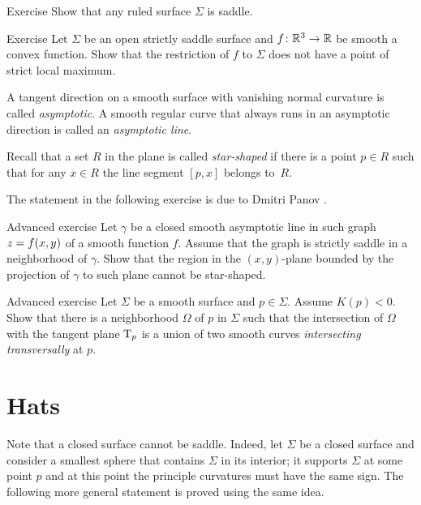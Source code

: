 \begin{thm}{Exercise}\label{ex:ruled=>saddle}
Show that any ruled surface $\Sigma$ is saddle.
\end{thm}

\begin{thm}{Exercise}\label{ex:saddle-convex}
Let $\Sigma$ be an open strictly saddle surface and $f\:\RR^3\z\to\RR$ be smooth a convex function.
Show that the restriction of $f$ to $\Sigma$ does not have a point of strict local maximum.
\end{thm}

A tangent direction on a smooth surface with vanishing normal curvature is called \emph{asymptotic}.
A smooth regular curve that always runs in an asymptotic direction is called an
\emph{asymptotic line}.\label{page:asymptotic line}

Recall that a set $R$ in the plane is called \emph{star-shaped} if there is a point $p\in R$ such that for any $x\in R$ the line segment $[p,x]$ belongs to~$R$.

The statement in the following exercise is due to Dmitri Panov \cite{panov-curves}.

\begin{thm}{Advanced exercise}\label{ex:panov}
Let $\gamma$ be a closed smooth asymptotic line
in such graph $z\z=f(x,y)$ of a smooth function $f$. 
Assume that the graph is strictly saddle in a neighborhood of $\gamma$.
Show that the region in the $(x,y)$-plane bounded by the projection of $\gamma$ to such plane cannot be star-shaped. 
\end{thm}

\begin{thm}{Advanced exercise}\label{ex:crosss}
Let $\Sigma$ be a smooth surface and $p\in \Sigma$.
Assume $K(p)<0$.
Show that there is a neighborhood $\Omega$ of $p$ in $\Sigma$
such that the intersection of $\Omega$ with the tangent plane $\mathrm{T}_p$ is a union of two smooth curves  \emph{intersecting transversally} at $p$.
\end{thm}


\section{Hats}

Note that a closed surface cannot be saddle.
Indeed, let $\Sigma$ be a closed surface and consider a smallest sphere that contains $\Sigma$ in its interior;
it supports $\Sigma$ at some point $p$ and at this point the principle curvatures must have the same sign.
The following more general statement  is proved using the same idea.

